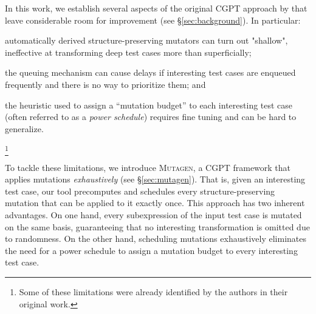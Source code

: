 \documentclass[sigconf,review,anonymous]{acmart}
\newcommand{\fuzzchick}{\textit{FuzzChick}\xspace}
\newcommand{\mutagen}{\textsc{Mutagen}\xspace}
\begin{document}
In this work, we establish several aspects of the original CGPT approach by
\citeauthor{lampropoulos2019coverage} that leave considerable room for
improvement (see \S \ref{sec:background}).
%
%
In particular:
%
\begin{inparaenum}
\item automatically derived structure-preserving mutators can turn out
"shallow", ineffective at transforming deep test cases more than superficially;
\item the queuing mechanism can cause delays if interesting test cases are
  enqueued frequently and there is no way to prioritize them; and
\item the heuristic used to assign a ``mutation budget'' to each interesting
  test case (often referred to as a \emph{power schedule}) requires fine tuning
  and can be hard to generalize.
\end{inparaenum}
%
\footnote{Some of these limitations were already identified by the authors in
their original work.}
%


To tackle these limitations, we introduce \mutagen, a CGPT framework that
applies mutations \emph{exhaustively} (see \S \ref{sec:mutagen}).
%
%
%
%
%
%
That is, given an interesting test case, our tool precomputes and schedules
every structure-preserving mutation that can be applied to it exactly once.
%
This approach has two inherent advantages. %
%
On one hand,
%
every subexpression of the input test case is mutated on the same basis,
guaranteeing that no interesting transformation is omitted due to randomness.
%
%
On the other hand, scheduling mutations exhaustively eliminates the need for a
power schedule to assign a mutation budget to every interesting test case.
\end{document}
